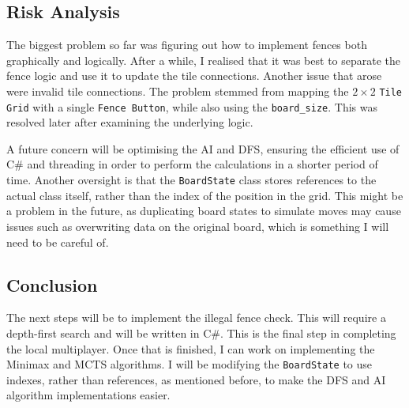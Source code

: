 \documentclass[progress]{cmpreport}
\begin{document}
\subsection{Risk Analysis}
The biggest problem so far was figuring out how to implement fences both graphically and logically. After a while, I realised that it was best to separate the fence logic and use it to update the tile connections. Another issue that arose were invalid tile connections. The problem stemmed from mapping the \(2 \times 2\) \texttt{Tile Grid} with a single \texttt{Fence Button}, while also using the \texttt{board\_size}. This was resolved later after examining the underlying logic.  

\noindent A future concern will be optimising the AI and DFS, ensuring the efficient use of C\# and threading in order to perform the calculations in a shorter period of time. Another oversight is that the \texttt{BoardState} class stores references to the actual class itself, rather than the index of the position in the grid. This might be a problem in the future, as duplicating board states to simulate moves may cause issues such as overwriting data on the original board, which is something I will need to be careful of.

\subsection{Conclusion}
The next steps will be to implement the illegal fence check. This will require a depth-first search and will be written in C\#. This is the final step in completing the local multiplayer. Once that is finished, I can work on implementing the Minimax and MCTS algorithms. I will be modifying the \texttt{BoardState} to use indexes, rather than references, as mentioned before, to make the DFS and AI algorithm implementations easier.

\newpage
\appendix
\end{document}
